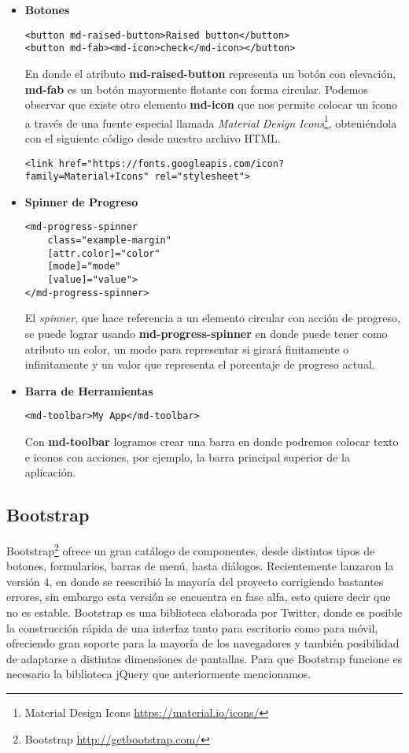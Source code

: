 \begin{itemize}
\item\textbf{Botones}
\begin{lstlisting}
<button md-raised-button>Raised button</button>
<button md-fab><md-icon>check</md-icon></button>
\end{lstlisting}
En donde el atributo \textbf{md-raised-button} representa un botón con elevación, \textbf{md-fab} es un botón mayormente flotante con forma circular. Podemos observar que existe otro elemento \textbf{md-icon} que nos permite colocar un ícono a través de una fuente especial llamada \textit{Material Design Icons}\footnote{Material Design Icons \url{https://material.io/icons/}}, obteniéndola con el siguiente código desde nuestro archivo HTML.
\begin{lstlisting}
<link href="https://fonts.googleapis.com/icon?family=Material+Icons" rel="stylesheet">
\end{lstlisting}

\item\textbf{Spinner de Progreso}
\begin{lstlisting}
<md-progress-spinner
    class="example-margin"
    [attr.color]="color"
    [mode]="mode"
    [value]="value">
</md-progress-spinner>
\end{lstlisting}
El \textit{spinner}, que hace referencia a un elemento circular con acción de progreso, se puede lograr usando \textbf{md-progress-spinner} en donde puede tener como atributo un color, un modo para representar si girará finitamente o infinitamente y un valor que representa el porcentaje de progreso actual.

\item\textbf{Barra de Herramientas}
\begin{lstlisting}
<md-toolbar>My App</md-toolbar>
\end{lstlisting}
Con \textbf{md-toolbar} logramos crear una barra en donde podremos colocar texto e iconos con acciones, por ejemplo, la barra principal superior de la aplicación.
\end{itemize}


\subsection{Bootstrap}

Bootstrap\footnote{Bootstrap \url{http://getbootstrap.com/}} ofrece un gran catálogo de componentes, desde distintos tipos de botones, formularios, barras de menú, hasta diálogos. Recientemente lanzaron la versión 4, en donde se reescribió la mayoría del proyecto corrigiendo bastantes errores, sin embargo esta versión se encuentra en fase alfa, esto quiere decir que no es estable. Bootstrap es una biblioteca elaborada por Twitter, donde es posible la construcción rápida de una interfaz tanto para escritorio como para móvil, ofreciendo gran soporte para la mayoría de los navegadores y también posibilidad de adaptarse a distintas dimensiones de pantallas. Para que Bootstrap funcione es necesario la biblioteca jQuery que anteriormente mencionamos.

